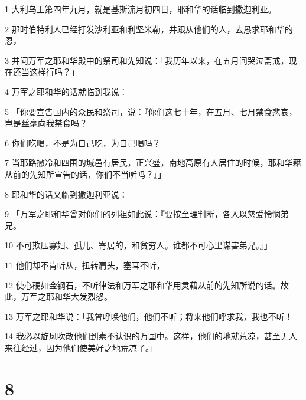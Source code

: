 \par 1 大利乌王第四年九月，就是基斯流月初四日，耶和华的话临到撒迦利亚。
\par 2 那时伯特利人已经打发沙利亚和利坚米勒，并跟从他们的人，去恳求耶和华的恩，
\par 3 并问万军之耶和华殿中的祭司和先知说：「我历年以来，在五月间哭泣斋戒，现在还当这样行吗？」
\par 4 万军之耶和华的话就临到我说：
\par 5 「你要宣告国内的众民和祭司，说：『你们这七十年，在五月、七月禁食悲哀，岂是丝毫向我禁食吗？
\par 6 你们吃喝，不是为自己吃，为自己喝吗？
\par 7 当耶路撒冷和四围的城邑有居民，正兴盛，南地高原有人居住的时候，耶和华藉从前的先知所宣告的话，你们不当听吗？』」
\par 8 耶和华的话又临到撒迦利亚说：
\par 9 「万军之耶和华曾对你们的列祖如此说：『要按至理判断，各人以慈爱怜悯弟兄。
\par 10 不可欺压寡妇、孤儿、寄居的，和贫穷人。谁都不可心里谋害弟兄。』」
\par 11 他们却不肯听从，扭转肩头，塞耳不听，
\par 12 使心硬如金钢石，不听律法和万军之耶和华用灵藉从前的先知所说的话。故此，万军之耶和华大发烈怒。
\par 13 万军之耶和华说：「我曾呼唤他们，他们不听；将来他们呼求我，我也不听！
\par 14 我必以旋风吹散他们到素不认识的万国中。这样，他们的地就荒凉，甚至无人来往经过，因为他们使美好之地荒凉了。」

\chapter{8}

